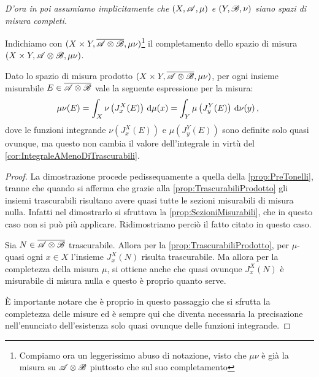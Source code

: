 \emph{D'ora in poi assumiamo implicitamente che $(X,\mathscr A,\mu)$ e $(Y,\mathscr B,\nu)$ siano spazi di misura completi.}

\begin{definition}\label{def:MisuraProdottoCompleta}
	Indichiamo con $(X\times Y,\overline{\mathscr A\otimes\mathscr B},\mu\nu)$\footnote{Compiamo ora un leggerissimo abuso di notazione, visto che $\mu\nu$ è già la misura su $\mathscr A\otimes\mathscr B$ piuttosto che sul suo completamento} il completamento dello spazio di misura $(X\times Y,\mathscr A\otimes\mathscr B,\mu\nu)$.
\end{definition}

\begin{proposition}\label{prop:PreTonelliCompleto}
	Dato lo spazio di misura prodotto $(X\times Y,\overline{\mathscr A\otimes\mathscr B},\mu\nu)$, per ogni insieme misurabile $E\in\overline{\mathscr A\otimes\mathscr B}$ \sigfin[o] vale la seguente espressione per la misura:
	\begin{equation*}
		\mu\nu(E)=\int_X\nu\left(J_x^X(E)\right)\,\mathrm d\mu(x)=\int_Y\mu\left(J_y^Y(E)\right)\,\mathrm d\nu(y)\, \text{, }
	\end{equation*}
	dove le funzioni integrande $\nu\left(J_x^X(E)\right)$ e $\mu\left(J_y^Y(E)\right)$ sono definite solo quasi ovunque, ma questo non cambia il valore dell'integrale in virtù del \cref{cor:IntegraleAMenoDiTrascurabili}.
\end{proposition}
\begin{proof}
	La dimostrazione procede pedissequamente a quella della \cref{prop:PreTonelli}, tranne che quando si afferma che grazie alla \cref{prop:TrascurabiliProdotto} gli insiemi trascurabili risultano avere quasi tutte le sezioni misurabili di misura nulla. Infatti nel dimostrarlo si sfruttava la \cref{prop:SezioniMisurabili}, che in questo caso non si può più applicare.
	Ridimostriamo perciò il fatto citato in questo caso.
	
	Sia $N\in\overline{\mathscr A\otimes\mathscr B}$ trascurabile. Allora per la \cref{prop:TrascurabiliProdotto}, per $\mu$-quasi ogni $x\in X$ l'insieme $J_x^X(N)$ risulta trascurabile. Ma allora per la completezza della misura $\mu$,  si ottiene anche che quasi ovunque $J_x^X(N)$ è misurabile di misura nulla e questo è proprio quanto serve.
	
	È importante notare che è proprio in questo passaggio che si sfrutta la completezza delle misure ed è sempre qui che diventa necessaria la precisazione nell'enunciato dell'esistenza solo quasi ovunque delle funzioni integrande.
\end{proof}

